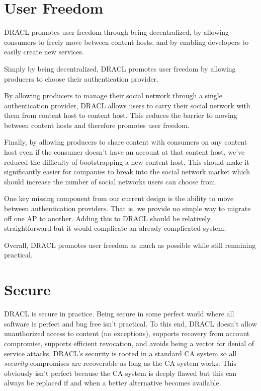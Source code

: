 \documentclass[pdftex,12pt,a4papaer,twoside,notitlepage]{report}
\begin{document}
\section{User Freedom}

DRACL promotes user freedom through being decentralized, by allowing consumers to
freely move between content hosts, and by enabling developers to easily create
new services.

Simply by being decentralized, DRACL promotes user freedom by allowing producers
to choose their authentication provider.

By allowing producers to manage their social network through a single
authentication provider, DRACL allows users to carry their social network with
them from content host to content host. This reduces the barrier to moving
between content hosts and therefore promotes user freedom.

Finally, by allowing producers to share content with consumers on any content
host even if the consumer doesn't have an account at that content host, we've
reduced the difficulty of bootstrapping a new content host. This should make it
significantly easier for companies to break into the social network market which
should increase the number of social networks users can choose from.

One key missing component from our current design is the ability to move between
authentication providers. That is, we provide no simple way to migrate off one
AP to another. Adding this to DRACL should be relatively straightforward but it
would complicate an already complicated system.

Overall, DRACL promotes user freedom as much as possible while still remaining
practical.

\section{Secure}
\label{sub:secure}

DRACL is secure in practice. Being secure in some perfect world where all
software is perfect and bug free isn't practical. To this end, DRACL doesn't
allow unauthorized access to content (no exceptions), supports recovery from
account compromise, supports efficient revocation, and avoids being a vector for
denial of service attacks. DRACL's security is rooted in a standard CA system so
all \emph{security} compromises are recoverable as long as the CA system works.
This obviously isn't perfect because the CA system is deeply flawed but this can
always be replaced if and when a better alternative becomes available.
\end{document}
